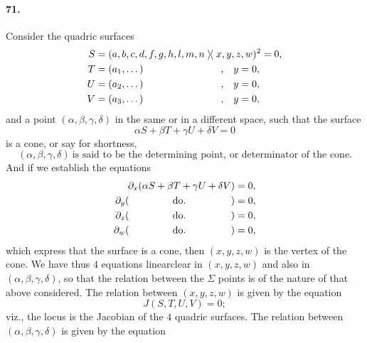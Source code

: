 \documentclass[11pt,a4paper]{article}
\providecommand{\quant}{\mathrel{\rangle\!\langle}}
\begin{document}
\bigskip

\paragraph{71.}
Consider the quadric surfaces
\begin{align*}
S &= (a, b, c, d, f, g, h, l, m, n \quant x, y, z, w)^2 = 0,\\
T &= (a_1, \ldots\,)\hspace{8pt}\text{\hphantom{ in the same or}}\hspace{4pt}\text{,}\quad y = 0,\\
U &= (a_2, \ldots\,)\hspace{8pt}\text{\hphantom{ in the same or}}\hspace{4pt}\text{,}\quad y = 0,\\
V &= (a_3, \ldots\,)\hspace{8pt}\text{\hphantom{ in the same or}}\hspace{4pt}\text{,}\quad y = 0,
\end{align*}
and a point $(\alpha, \beta, \gamma, \delta)$ in the same or in a different space,
such that the surface
\[
\alpha S + \beta T + \gamma U + \delta V = 0
\]
is a cone, or say for shortness,
\[
(\alpha, \beta, \gamma, \delta)\ \text{is said to be the determining point, or
determinator of the cone.}
\]
And if we establish the equations
\begin{align*}
\partial_x(\alpha S + \beta T + \gamma U + \delta V) &= 0,\\
\partial_y(\hspace{15.5mm}\text{do.}\hspace{16mm}) &= 0,\\
\partial_z(\hspace{15.5mm}\text{do.}\hspace{16mm}) &= 0,\\
\partial_w(\hspace{15.5mm}\text{do.}\hspace{16mm}) &= 0,
\end{align*}
which express that the surface is a cone, then $(x, y, z, w)$ is the vertex of the
cone. We have thus $4$ equations linearclear in $(x, y, z, w)$ and also in
$(\alpha, \beta, \gamma, \delta)$, so that the relation between the $\Sigma$ points
is of the nature of that above considered. The relation between $(x, y, z, w)$ is
given by the equation
\[
J(S, T, U, V) = 0;
\]
viz., the locus is the Jacobian of the $4$ quadric surfaces. The relation between
$(\alpha, \beta, \gamma, \delta)$ is given by the equation
\end{document}
